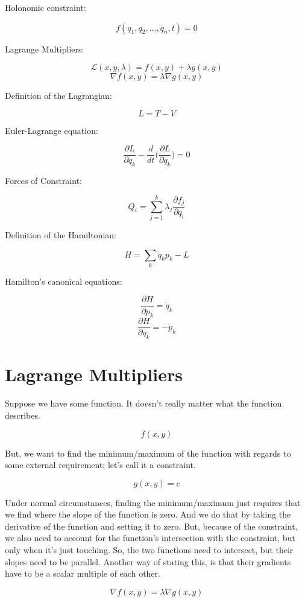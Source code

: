 \documentclass{article}
\begin{document}
Holonomic constraint:

$$f( q_1, q_2, ..., q_n, t ) = 0$$


Lagrange Multipliers:

$$\mathcal{ L }( x, y, \lambda ) = f( x, y ) + \lambda g( x, y )$$
$$\nabla f( x, y ) = \lambda \nabla g( x, y )$$

Definition of the Lagrangian:

$$L = T - V$$

Euler-Lagrange equation:

$$\frac{ \partial L }{ \partial q_k } - \frac{ d }{ dt } \Big( \frac{ \partial L }{ \partial \dot{ q }_k } \Big) = 0$$

Forces of Constraint:

$$Q_i = \sum_{j=1}^k \lambda_j \frac{ \partial f_j }{ \partial q_i }$$

Definition of the Hamiltonian:

$$H = \sum_k \dot{ q }_k p_k - L$$

Hamilton's canonical equations:

$$\frac{ \partial H }{ \partial p_k } = \dot{ q }_k$$
$$\frac{ \partial H }{ \partial q_k } = -\dot{ p }_k$$



%
%
\newpage
\section{Lagrange Multipliers}

Suppose we have some function.  It doesn't really matter what the function describes.

$$f( x, y )$$

But, we want to find the minimum/maximum of the function with regards to some external requirement; let's call it a constraint.

$$g( x, y ) = c$$

Under normal circumstances, finding the minimum/maximum just requires that we find where the slope of the function is zero.  And we do that by taking the derivative of the function and setting it to zero.  But, because of the constraint, we also need to account for the function's intersection with the constraint, but only when it's just touching.  So, the two functions need to intersect, but their slopes need to be parallel.  Another way of stating this, is that their gradients have to be a scalar multiple of each other.

$$\nabla f( x, y ) = \lambda \nabla g( x, y )$$
\end{document}
